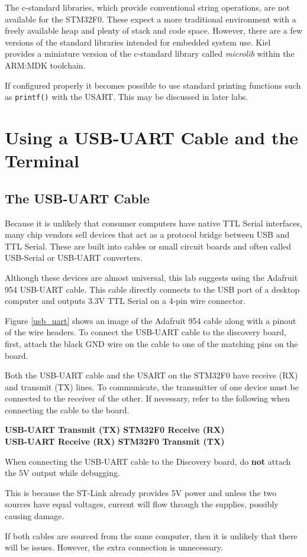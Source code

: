 \documentclass[openany,11pt,fleqn]{book} %
\begin{document}
The c-standard libraries, which provide conventional string operations, are not available for the STM32F0. These expect a more traditional environment with a freely available heap and plenty of stack and code space. However, there are a few versions of the standard libraries intended for embedded system use. Kiel provides a miniature version of the c-standard library called \textit{microlib} within the ARM:MDK toolchain.

If configured properly it becomes possible to use standard printing functions such as \texttt{printf()} with the USART. This may be discussed in later labs. 


\section{Using a USB-UART Cable and the Terminal}
\subsection{The USB-UART Cable}
Because it is unlikely that consumer computers have native TTL Serial interfaces, many chip vendors sell devices that act as a protocol bridge between USB and TTL Serial. These are built into cables or small circuit boards and often called USB-Serial or USB-UART converters. 

Although these devices are almost universal, this lab suggests using the Adafruit 954 USB-UART cable. This cable directly connects to the USB port of a desktop computer and outputs 3.3V TTL Serial on a 4-pin wire connector. 

Figure \ref{usb_uart} shows an image of the Adafruit 954 cable along with a pinout of the wire headers. To connect the USB-UART cable to the discovery board, first, attach the black GND wire on the cable to one of the matching pins on the board. 

Both the USB-UART cable and the USART on the STM32F0 have receive (RX) and transmit (TX) lines. To communicate, the transmitter of one device must be connected to the receiver of the other. If necessary, refer to the following when connecting the cable to the board. \\

\parbox{\textwidth} {
    \centering
    \textbf{USB-UART Transmit (TX) \textrightarrow  STM32F0 Receive (RX) \\
    USB-UART Receive (RX) \textrightarrow  STM32F0 Transmit (TX)}
}
    

\begin{warning}
When connecting the USB-UART cable to the Discovery board, do \textbf{not} attach the 5V output while debugging. 

This is because the ST-Link already provides 5V power and unless the two sources have equal voltages, current will flow through the supplies, possibly causing damage. 

If both cables are sourced from the same computer, then it is unlikely that there will be issues. However, the extra connection is unnecessary.
\end{warning}
\end{document}
